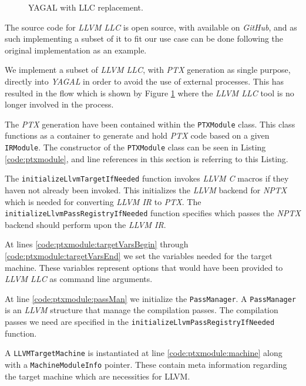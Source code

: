\begin{figure}[!htb]
\begin{minipage}{0.4\textwidth}
        \caption{YAGAL with LLC replacement.}
        \label{fig:noLLC}
    \end{minipage}
\end{figure}

The source code for \textit{LLVM LLC} is open source, with available on \textit{GitHub}\cite{llvmGithub}, and as such implementing a subset of it to fit our use case can be done following the original implementation as an example.

We implement a subset of \textit{LLVM LLC}, with \textit{PTX} generation as single purpose, directly into \textit{YAGAL} in order to avoid the use of external processes. This has resulted in the flow which is shown by Figure \ref{fig:noLLC} where the \textit{LLVM LLC} tool is no longer involved in the process.

The \textit{PTX} generation have been contained within the \texttt{PTXModule} class. This class functions as a container to generate and hold \textit{PTX} code based on a given \texttt{IRModule}. The constructor of the \texttt{PTXModule} class can be seen in Listing \ref{code:ptxmodule}, and line references in this section is referring to this Listing. 

The \texttt{initializeLlvmTargetIfNeeded} function invokes \textit{LLVM C} macros if they haven not already been invoked. This initializes the \textit{LLVM} backend for \textit{NPTX} which is needed for converting \textit{LLVM IR} to \textit{PTX}. The \texttt{initializeLlvmPassRegistryIfNeeded} function specifies which passes the \textit{NPTX} backend should perform upon the \textit{LLVM IR}.

At lines \ref{code:ptxmodule:targetVarsBegin} through \ref{code:ptxmodule:targetVarsEnd} we set the variables needed for the target machine. These variables represent options that would have been provided to \textit{LLVM LLC} as command line arguments.

At line \ref{code:ptxmodule:passMan} we initialize the \texttt{PassManager}. A \texttt{PassManager} is an \textit{LLVM} structure that manage the compilation passes. The compilation passes we need are specified in the \texttt{initializeLlvmPassRegistryIfNeeded} function.


A \texttt{LLVMTargetMachine} is instantiated at line \ref{code:ptxmodule:machine} along with a \texttt{MachineModuleInfo} pointer. These contain meta information regarding the target machine which are necessities for LLVM.

